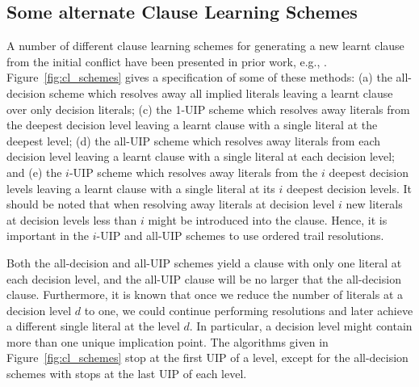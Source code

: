 \documentclass[runningheads]{llncs}
\begin{document}
\subsection{Some alternate Clause Learning Schemes}
A number of different clause learning schemes for generating a new
learnt clause from the initial conflict have been presented in prior
work, e.g.,
\cite{DBLP:conf/iccad/ZhangMMM01,DBLP:conf/iccad/SilvaS96,DBLP:journals/tc/Marques-SilvaS99,DBLP:conf/aaai/BayardoS97}.
Figure~\ref{fig:cl_schemes} gives a specification of some of these
methods: (a) the all-decision scheme which resolves away all implied
literals leaving a learnt clause over only decision literals; (c) the
1-UIP scheme which resolves away literals from the deepest decision
level leaving a learnt clause with a single literal at the deepest
level; (d) the all-UIP scheme which resolves away literals from each
decision level leaving a learnt clause with a single literal at each
decision level; and (e) the $i$-UIP scheme which resolves away
literals from the $i$ deepest decision levels leaving a learnt clause
with a single literal at its $i$ deepest decision levels. It should be
noted that when resolving away literals at decision level $i$ new
literals at decision levels less than $i$ might be introduced into the
clause. Hence, it is important in the $i$-UIP and all-UIP schemes to
use ordered trail resolutions.

Both the all-decision and all-UIP schemes yield a clause with only one
literal at each decision level, and the all-UIP clause will be no
larger that the all-decision clause. Furthermore, it is known
\cite{DBLP:journals/tc/Marques-SilvaS99} that once we reduce the
number of literals at a decision level $d$ to one, we could continue
performing resolutions and later achieve a different single literal at
the level $d$. In particular, a decision level might contain more than
one unique implication point. The algorithms given in
Figure~\ref{fig:cl_schemes} stop at the first UIP of a level, except
for the all-decision schemes with stops at the last UIP of each level.
\end{document}
